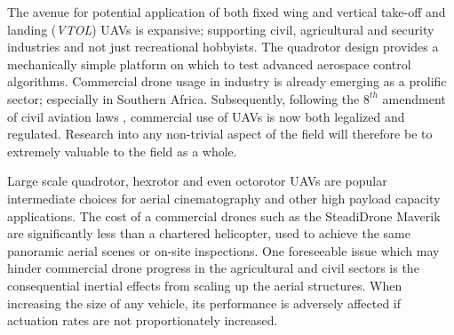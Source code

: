 \par
The avenue for potential application of both fixed wing and vertical take-off and landing (\emph{VTOL}) UAVs is expansive; supporting civil\cite{civilquadcopter}, agricultural\cite{agriculturequadcopter} and security\cite{videosurveillancequadcopter} industries and not just recreational hobbyists. The quadrotor design provides a mechanically simple platform on which to test advanced aerospace control algorithms. Commercial drone usage in industry is already emerging as a prolific sector; especially in Southern Africa. Subsequently, following the $8^{th}$ amendment of civil aviation laws \cite{dronelaw}, commercial use of UAVs is now both legalized and regulated. Research into any non-trivial aspect of the field will therefore be to extremely valuable to the field as a whole. 
\par
Large scale quadrotor, hexrotor and even octorotor UAVs are popular intermediate choices for aerial cinematography and other high payload capacity applications. The cost of a commercial drones such as the SteadiDrone Maverik \cite{steadidrone} are significantly less than a chartered helicopter, used to achieve the same panoramic aerial scenes or on-site inspections. One foreseeable issue which may hinder commercial drone progress in the agricultural and civil sectors is the consequential inertial effects from scaling up the aerial structures. When increasing the size of any vehicle, its performance is adversely affected if actuation rates are not proportionately increased.
